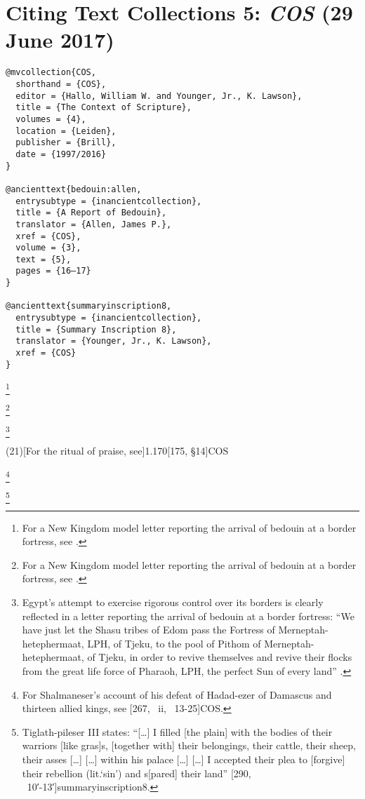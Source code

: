 \documentclass[a4paper]{article}
\begin{document}
\section{Citing Text Collections 5: \emph{COS} (29 June 2017)}

\begin{verbatim}
@mvcollection{COS,
  shorthand = {COS},
  editor = {Hallo, William W. and Younger, Jr., K. Lawson},
  title = {The Context of Scripture},
  volumes = {4},
  location = {Leiden},
  publisher = {Brill},
  date = {1997/2016}
}

@ancienttext{bedouin:allen,
  entrysubtype = {inancientcollection},
  title = {A Report of Bedouin},
  translator = {Allen, James P.},
  xref = {COS},
  volume = {3},
  text = {5},
  pages = {16–17}
}

@ancienttext{summaryinscription8,
  entrysubtype = {inancientcollection},
  title = {Summary Inscription 8},
  translator = {Younger, Jr., K. Lawson},
  xref = {COS}
}
\end{verbatim}

\begin{fverbcite}{13}
  \footnote{For a New Kingdom model letter reporting the arrival of bedouin at
    a border fortress, see .}
\end{fverbcite}
\begin{fverbcite}{13}
  \footnote{For a New Kingdom model letter reporting the arrival of bedouin at
    a border fortress, see \cite{bedouin:allen}.}
\end{fverbcite}
\begin{fverbcite}{13}
  \footnote{Egypt’s attempt to exercise rigorous control over its borders is
    clearly reflected in a letter reporting the arrival of bedouin at a border
    fortress: “We have just let the Shasu tribes of Edom pass the Fortress of
    Merneptah-hetephermaat, LPH, of Tjeku, to the pool of Pithom of
    Merneptah-hetephermaat, of Tjeku, in order to revive themselves and revive
    their flocks from the great life force of Pharaoh, LPH, the perfect Sun of
    every land” .}
\end{fverbcite}
\examplevolcite(21)[For the ritual of praise, see]{1.170}[175, §14]{COS}
\begin{fverbcite}{37}
  \footnote{For Shalmaneser’s account of his defeat of Hadad-ezer of Damascus
    and thirteen allied kings, see [267, \colno~ii,
    \linesno~13-25]{COS}.}
\end{fverbcite}
\begin{fverbcite}{42}
  \footnote{Tiglath-pileser III states: “[…] I filled [the plain] with the
    bodies of their warriors [like gras]s, [together with] their belongings,
    their cattle, their sheep, their asses […] […] within his palace […] […] I
    accepted their plea to [forgive] their rebellion (lit.\@ ‘sin’) and
    s[pared] their land” [290,
    \linesno~10′-13′]{summaryinscription8}.}
\end{fverbcite}
\exampleabbreviations
{}
\end{document}
